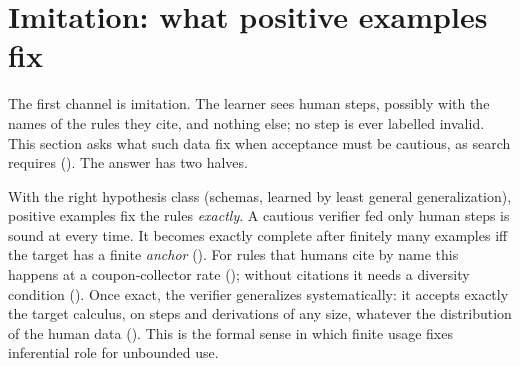 \providecommand{\vars}{\mathrm{vars}}
\providecommand{\rt}{\mathrm{root}}
\providecommand{\Sub}{\mathrm{Sub}}
\providecommand{\Acc}{\mathrm{Acc}}
\providecommand{\Fail}{\mathfrak F}

\section{Imitation: what positive examples fix}\label{sec:imitation}

The first channel is imitation. The learner sees human steps, possibly with the names of the rules they cite, and nothing else; no step is ever labelled invalid. This section asks what such data fix when acceptance must be cautious, as search requires (). The answer has two halves.

With the right hypothesis class (schemas, learned by least general generalization), positive examples fix the rules \emph{exactly}. A cautious verifier fed only human steps is sound at every time. It becomes exactly complete after finitely many examples iff the target has a finite \emph{anchor} (). For rules that humans cite by name this happens at a coupon-collector rate (); without citations it needs a diversity condition (). Once exact, the verifier generalizes systematically: it accepts exactly the target calculus, on steps and derivations of any size, whatever the distribution of the human data (). This is the formal sense in which finite usage fixes inferential role for unbounded use.

